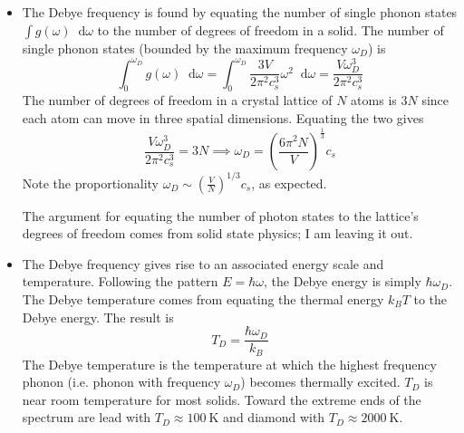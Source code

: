 \documentclass[11pt, a4paper]{article}
\newcommand{\diff}{\mathop{}\!\mathrm{d}} %
\begin{document}
\begin{itemize}
	\item The Debye frequency is found by equating the number of single phonon states $ \int g(\omega)\diff \omega $ to the number of degrees of freedom in a solid. The number of single phonon states (bounded by the maximum frequency $ \omega_{D} $) is
	\begin{equation*}
		\int_{0}^{\omega_{D}} g(\omega)\diff \omega  = \int_{0}^{\omega_{D}}\frac{3V}{2\pi^{2}c_{s}^{3}} \omega^{2} \diff \omega = \frac{V\omega_{D}^{3}}{2\pi^{2}c_{s}^{3}}
	\end{equation*}
	The number of degrees of freedom in a crystal lattice of $ N $ atoms is $ 3N $ since each atom can move in three spatial dimensions. Equating the two gives
	\begin{equation*}
		\frac{V\omega_{D}^{3}}{2\pi^{2}c_{s}^{3}} = 3N \implies \omega_{D} = \left(\frac{6\pi^{2}N}{V}\right)^{\frac{1}{3}}c_{s}
	\end{equation*}
	Note the proportionality $ \omega_{D} \sim \left(\frac{V}{N}\right)^{1/3} c_{s} $, as expected. 
	
	The argument for equating the number of photon states to the lattice's degrees of freedom comes from solid state physics; I am leaving it out.
	
	\item The Debye frequency gives rise to an associated energy scale and temperature. Following the pattern $ E = \hbar \omega $, the Debye energy is simply $ \hbar \omega_{D} $. The Debye temperature comes from equating the thermal energy $ k_{B}T $ to the Debye energy. The result is
	\begin{equation*}
		T_{D} = \frac{\hbar \omega_{D}}{k_{B}}
	\end{equation*}
	The Debye temperature is the temperature at which the highest frequency phonon (i.e. phonon with frequency $ \omega_{D} $) becomes thermally excited. $ T_{D} $ is near room temperature for most solids. Toward the extreme ends of the spectrum are lead with $ T_{D} \approx \SI{100}{\kelvin} $ and diamond with $ T_{D} \approx \SI{2000}{\kelvin} $. 
	
\end{itemize}
\end{document}
